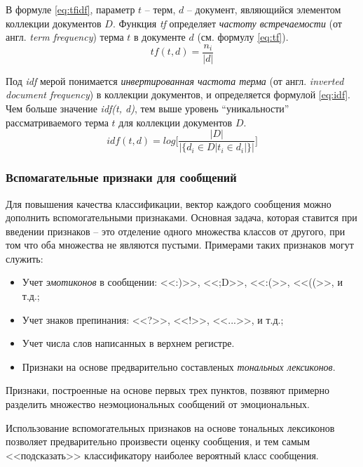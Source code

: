         В формуле \ref{eq:tfidf}, параметр $t$ -- терм, $d$ -- документ, являющийся
        элементом коллекции документов $D$. Функция {\it tf} определяет {\it частоту встречаемости}
        (от англ. {\it term frequency}) терма $t$ в документе $d$ (см. формулу \ref{eq:tf}).
        \begin{equation}
            \label{eq:tf}
            tf(t, d) = \dfrac{n_i}{|d|}
        \end{equation}

        Под {\it idf } мерой понимается {\it инвертированная частота терма} (от англ.
        {\it inverted document frequency}) в коллекции документов, и определяется
        формулой \ref{eq:idf}. Чем больше значение {\it idf(t, d)}, тем выше уровень
        ``уникальности'' рассматриваемого терма $t$ для коллекции документов $D$.
        \begin{equation}
            \label{eq:idf}
            idf(t, d) = log \Bigg[ \dfrac{|D|}{|\{d_i \in D | t_i \in d_i|\}|} \Bigg]
        \end{equation}

        \subsubsection{Вспомагательные признаки для сообщений}
        Для повышения качества классификации, вектор каждого сообщения можно дополнить
        вспомогательными признаками. Основная задача, которая ставится при введении
        признаков -- это отделение одного множества классов от другого, при том что
        оба множества не являются пустыми. Примерами таких признаков могут служить:
        \begin{itemize}
            \item Учет {\it эмотиконов} в сообщении: <<:)>>, <<;D>>, <<:(>>, <<((>>, и т.д.;
            \item Учет знаков препинания: <<?>>, <<!>>, <<...>>, и т.д.;
            \item Учет числа слов написанных в верхнем регистре.
            \item Признаки на основе предварительно составленых {\it тональных лексиконов}.
        \end{itemize}

        Признаки, построенные на основе первых трех пунктов, позвяют примерно разделить
        множество неэмоциональных сообщений от эмоциональных.

        Использование вспомогательных признаков на основе тональных лексиконов
        позволяет предварительно произвести оценку сообщения, и тем самым
        <<подсказать>> классификатору наиболее вероятный класс сообщения.

